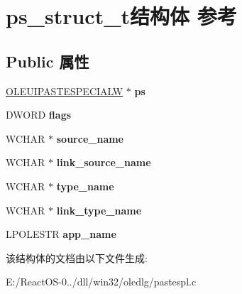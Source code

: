 \hypertarget{structps__struct__t}{}\section{ps\+\_\+struct\+\_\+t结构体 参考}
\label{structps__struct__t}
\subsection*{Public 属性}
\begin{DoxyCompactItemize}
\item 
\mbox{\label{structps__struct__t_a0ff47e1fdb3b5e1edfbf35302e364a1c}} 
\hyperlink{structtag_o_l_e_u_i_p_a_s_t_e_s_p_e_c_i_a_l_w}{O\+L\+E\+U\+I\+P\+A\+S\+T\+E\+S\+P\+E\+C\+I\+A\+LW} $\ast$ {\bfseries ps}
\item 
\mbox{\label{structps__struct__t_a25237bebdd32d5ff1bdeaea7385240ce}} 
D\+W\+O\+RD {\bfseries flags}
\item 
\mbox{\label{structps__struct__t_a198e1cea72763908c052cf42b5060014}} 
W\+C\+H\+AR $\ast$ {\bfseries source\+\_\+name}
\item 
\mbox{\label{structps__struct__t_a777ea207c457c58e96dc483885d4a9c1}} 
W\+C\+H\+AR $\ast$ {\bfseries link\+\_\+source\+\_\+name}
\item 
\mbox{\label{structps__struct__t_abd3e17cf8815022c85fbbe2d350fe6a5}} 
W\+C\+H\+AR $\ast$ {\bfseries type\+\_\+name}
\item 
\mbox{\label{structps__struct__t_a72724e2eaa8216ecff481aff785207bf}} 
W\+C\+H\+AR $\ast$ {\bfseries link\+\_\+type\+\_\+name}
\item 
\mbox{\label{structps__struct__t_a657ea4f3da7f5d419584133974bbe08a}} 
L\+P\+O\+L\+E\+S\+TR {\bfseries app\+\_\+name}
\end{DoxyCompactItemize}


该结构体的文档由以下文件生成\+:\begin{DoxyCompactItemize}
\item 
E\+:/\+React\+O\+S-\/0../dll/win32/oledlg/pastespl.\+c\end{DoxyCompactItemize}
